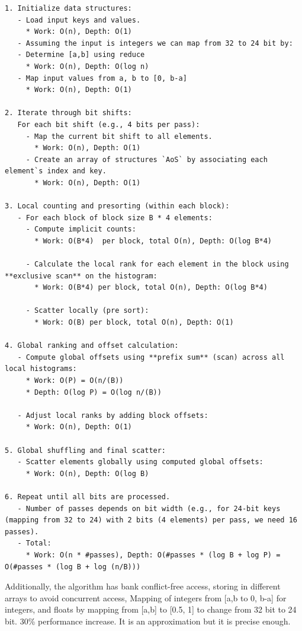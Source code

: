\documentclass{article}
\begin{document}
\begin{lstlisting}
1. Initialize data structures:
   - Load input keys and values.
     * Work: O(n), Depth: O(1)
   - Assuming the input is integers we can map from 32 to 24 bit by:
   - Determine [a,b] using reduce
     * Work: O(n), Depth: O(log n)
   - Map input values from a, b to [0, b-a]
     * Work: O(n), Depth: O(1)
     
2. Iterate through bit shifts:
   For each bit shift (e.g., 4 bits per pass):
     - Map the current bit shift to all elements.
       * Work: O(n), Depth: O(1)
     - Create an array of structures `AoS` by associating each element`s index and key.
       * Work: O(n), Depth: O(1)

3. Local counting and presorting (within each block):
   - For each block of block size B * 4 elements:
     - Compute implicit counts:
       * Work: O(B*4)  per block, total O(n), Depth: O(log B*4)

     - Calculate the local rank for each element in the block using **exclusive scan** on the histogram:
       * Work: O(B*4) per block, total O(n), Depth: O(log B*4)

     - Scatter locally (pre sort):
       * Work: O(B) per block, total O(n), Depth: O(1)

4. Global ranking and offset calculation:
   - Compute global offsets using **prefix sum** (scan) across all local histograms:
     * Work: O(P) = O(n/(B))
     * Depth: O(log P) = O(log n/(B))

   - Adjust local ranks by adding block offsets:
     * Work: O(n), Depth: O(1)

5. Global shuffling and final scatter:
   - Scatter elements globally using computed global offsets:
     * Work: O(n), Depth: O(log B)

6. Repeat until all bits are processed.
   - Number of passes depends on bit width (e.g., for 24-bit keys (mapping from 32 to 24) with 2 bits (4 elements) per pass, we need 16 passes).
   - Total:
     * Work: O(n * #passes), Depth: O(#passes * (log B + log P) = O(#passes * (log B + log (n/B)))
\end{lstlisting}

Additionally, the algorithm has bank conflict-free access, storing in different arrays to avoid concurrent access, 
Mapping of integers from [a,b to 0, b-a] for integers, and floats by mapping from [a,b] to [0.5, 1] to change from 32 bit to 24 bit. 30\% performance increase. It is an approximation but it is precise enough.
\end{document}
